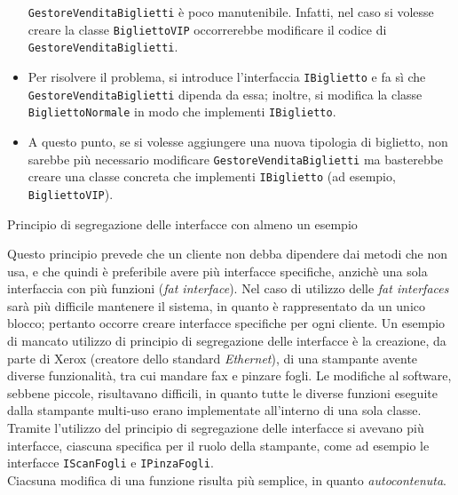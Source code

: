 \begin{solution}
\begin{itemize}
        \texttt{GestoreVenditaBiglietti} è poco manutenibile.
    \newline Infatti, nel caso si volesse creare la classe
    \texttt{BigliettoVIP} occorrerebbe modificare il codice di
    \\\texttt{GestoreVenditaBiglietti}.
    \item Per risolvere il problema, si introduce l'interfaccia
        \texttt{IBiglietto} e fa sì che \texttt{GestoreVenditaBiglietti}
        dipenda da essa; inoltre, si modifica la classe
        \texttt{BigliettoNormale} in modo che implementi \texttt{IBiglietto}.
    \item A questo punto, se si volesse aggiungere una nuova tipologia di
        biglietto, non sarebbe più necessario modificare
        \texttt{GestoreVenditaBiglietti} ma basterebbe creare una classe
        concreta che implementi \texttt{IBiglietto} (ad esempio,
        \texttt{BigliettoVIP}).
\end{itemize}
\end{solution}


\begin{problem}{1.13}
Principio di segregazione delle interfacce con almeno un esempio
\end{problem}
\begin{solution}
Questo principio prevede che un cliente non debba dipendere dai metodi che non usa, e che quindi è preferibile avere più interfacce specifiche, anzichè una sola interfaccia con più funzioni (\textit{fat interface}).
\newline
Nel caso di utilizzo delle \textit{fat interfaces} sarà più difficile mantenere il sistema, in quanto è rappresentato da un unico blocco; pertanto occorre creare interfacce specifiche per ogni cliente.
\newline
Un esempio di mancato utilizzo di principio di segregazione delle interfacce è la creazione, da parte di Xerox (creatore dello standard \textit{Ethernet}), di una stampante avente diverse funzionalità, tra cui mandare fax e pinzare fogli. Le modifiche al software, sebbene piccole, risultavano difficili, in quanto tutte le diverse funzioni eseguite dalla stampante multi-uso erano implementate all'interno di una sola classe.
Tramite l'utilizzo del principio di segregazione delle interfacce si avevano più interfacce, ciascuna specifica per il ruolo della stampante, come ad esempio le interfacce \texttt{IScanFogli} e \texttt{IPinzaFogli}.
\\
Ciacsuna modifica di una funzione risulta più semplice, in quanto \textit{autocontenuta}.
\end{solution}


